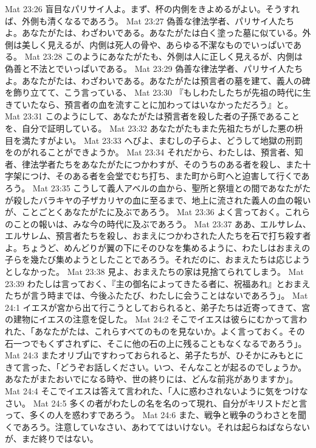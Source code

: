 Mat 23:26  盲目なパリサイ人よ。まず、杯の内側をきよめるがよい。そうすれば、外側も清くなるであろう。
Mat 23:27  偽善な律法学者、パリサイ人たちよ。あなたがたは、わざわいである。あなたがたは白く塗った墓に似ている。外側は美しく見えるが、内側は死人の骨や、あらゆる不潔なものでいっぱいである。
Mat 23:28  このようにあなたがたも、外側は人に正しく見えるが、内側は偽善と不法とでいっぱいである。
Mat 23:29  偽善な律法学者、パリサイ人たちよ。あなたがたは、わざわいである。あなたがたは預言者の墓を建て、義人の碑を飾り立てて、こう言っている、
Mat 23:30  『もしわたしたちが先祖の時代に生きていたなら、預言者の血を流すことに加わってはいなかっただろう』と。
Mat 23:31  このようにして、あなたがたは預言者を殺した者の子孫であることを、自分で証明している。
Mat 23:32  あなたがたもまた先祖たちがした悪の枡目を満たすがよい。
Mat 23:33  へびよ、まむしの子らよ、どうして地獄の刑罰をのがれることができようか。
Mat 23:34  それだから、わたしは、預言者、知者、律法学者たちをあなたがたにつかわすが、そのうちのある者を殺し、また十字架につけ、そのある者を会堂でむち打ち、また町から町へと迫害して行くであろう。
Mat 23:35  こうして義人アベルの血から、聖所と祭壇との間であなたがたが殺したバラキヤの子ザカリヤの血に至るまで、地上に流された義人の血の報いが、ことごとくあなたがたに及ぶであろう。
Mat 23:36  よく言っておく。これらのことの報いは、みな今の時代に及ぶであろう。
Mat 23:37  ああ、エルサレム、エルサレム、預言者たちを殺し、おまえにつかわされた人たちを石で打ち殺す者よ。ちょうど、めんどりが翼の下にそのひなを集めるように、わたしはおまえの子らを幾たび集めようとしたことであろう。それだのに、おまえたちは応じようとしなかった。
Mat 23:38  見よ、おまえたちの家は見捨てられてしまう。
Mat 23:39  わたしは言っておく、『主の御名によってきたる者に、祝福あれ』とおまえたちが言う時までは、今後ふたたび、わたしに会うことはないであろう」。
Mat 24:1  イエスが宮から出て行こうとしておられると、弟子たちは近寄ってきて、宮の建物にイエスの注意を促した。
Mat 24:2  そこでイエスは彼らにむかって言われた、「あなたがたは、これらすべてのものを見ないか。よく言っておく。その石一つでもくずされずに、そこに他の石の上に残ることもなくなるであろう」。
Mat 24:3  またオリブ山ですわっておられると、弟子たちが、ひそかにみもとにきて言った、「どうぞお話しください。いつ、そんなことが起るのでしょうか。あなたがまたおいでになる時や、世の終りには、どんな前兆がありますか」。
Mat 24:4  そこでイエスは答えて言われた、「人に惑わされないように気をつけなさい。
Mat 24:5  多くの者がわたしの名を名のって現れ、自分がキリストだと言って、多くの人を惑わすであろう。
Mat 24:6  また、戦争と戦争のうわさとを聞くであろう。注意していなさい、あわててはいけない。それは起らねばならないが、まだ終りではない。
